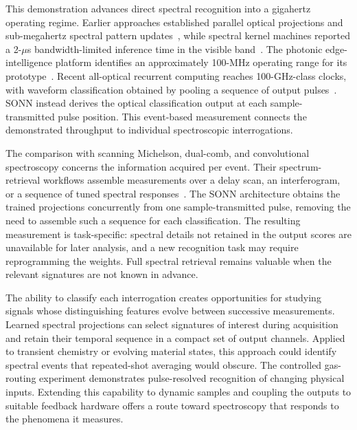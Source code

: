 \documentclass[11pt]{article}
\begin{document}
This demonstration advances direct spectral recognition into a gigahertz operating regime. Earlier approaches established parallel optical projections and sub-megahertz spectral pattern updates~\cite{vornehm2014,huh2018}, while spectral kernel machines reported a 2-$\mu$s bandwidth-limited inference time in the visible band~\cite{zhang2025kernel}. The photonic edge-intelligence platform identifies an approximately 100-MHz operating range for its prototype~\cite{zhang2025edge}. Recent all-optical recurrent computing reaches 100-GHz-class clocks, with waveform classification obtained by pooling a sequence of output pulses~\cite{li2026}. SONN instead derives the optical classification output at each sample-transmitted pulse position. This event-based measurement connects the demonstrated throughput to individual spectroscopic interrogations.

The comparison with scanning Michelson, dual-comb, and convolutional spectroscopy concerns the information acquired per event. Their spectrum-retrieval workflows assemble measurements over a delay scan, an interferogram, or a sequence of tuned spectral responses~\cite{yang2021,picque2019,coddington2016,long2024,yao2026}. The SONN architecture obtains the trained projections concurrently from one sample-transmitted pulse, removing the need to assemble such a sequence for each classification. The resulting measurement is task-specific: spectral details not retained in the output scores are unavailable for later analysis, and a new recognition task may require reprogramming the weights. Full spectral retrieval remains valuable when the relevant signatures are not known in advance.

The ability to classify each interrogation creates opportunities for studying signals whose distinguishing features evolve between successive measurements. Learned spectral projections can select signatures of interest during acquisition and retain their temporal sequence in a compact set of output channels. Applied to transient chemistry or evolving material states, this approach could identify spectral events that repeated-shot averaging would obscure. The controlled gas-routing experiment demonstrates pulse-resolved recognition of changing physical inputs. Extending this capability to dynamic samples and coupling the outputs to suitable feedback hardware offers a route toward spectroscopy that responds to the phenomena it measures.
\end{document}
